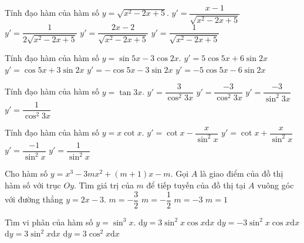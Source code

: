 \begin{ex}%
Tính đạo hàm của hàm số $y=\sqrt{x^{2}-2x+5}$.
\choice
{\True $y'=\dfrac{x-1}{\sqrt{x^{2}-2x+5}}$}
{$y'=\dfrac{1}{2\sqrt{x^{2}-2x+5}}$}
{$y'=\dfrac{2x-2}{\sqrt{x^{2}-2x+5}}$}
{$y'=\dfrac{1}{\sqrt{x^{2}-2x+5}}$}
\end{ex}

\begin{ex}%
Tính đạo hàm của hàm số $y=\sin 5x-3\cos 2x$.
\choice
{\True $y'=5\cos 5x+6\sin 2x$}
{$y'=\cos 5x+3\sin 2x$}
{$y'=-\cos 5x-3\sin 2x$}
{$y'=-5\cos 5x-6\sin 2x$}
\end{ex}

\begin{ex}%
Tính đạo hàm của hàm số $y=\tan 3x$.
\choice
{\True $y'=\dfrac{3}{\cos^{2}3x}$}
{$y'=\dfrac{-3}{\cos^{2}3x}$}
{$y'=\dfrac{-3}{\sin^{2}3x}$}
{$y'=\dfrac{1}{\cos^{2}3x}$}
\end{ex}

\begin{ex}%
Tính đạo hàm của hàm số $y=x\cot x$.
\choice
{\True $y'=\cot x-\dfrac{x}{\sin^{2}x}$}
{$y'=\cot x+\dfrac{x}{\sin^{2}x}$}
{$y'=\dfrac{-1}{\sin^{2}x}$}
{$y'=\dfrac{1}{\sin^{2}x}$}
\end{ex}

\begin{ex}%
Cho hàm số $y=x^{3}-3mx^{2}+(m+1)x-m$. Gọi $A$ là giao điểm của đồ thị hàm số với trục $Oy$. Tìm giá trị của $m$ để tiếp tuyến của đồ thị tại $A$ vuông góc với đường thẳng $y=2x-3$.
\choice
{\True $m=-\dfrac{3}{2}$}
{$m=-\dfrac{1}{2}$}
{$m=-3$}
{$m=1$}
\end{ex}

\begin{ex}%
Tìm vi phân của hàm số $y=\sin^{3}x$.
\choice
{\True $\mathrm{d}y=3\sin^{2}x\cos x\mathrm{d}x$}
{$\mathrm{d}y=-3\sin^{2}x\cos x\mathrm{d}x$}
{$\mathrm{d}y=3\sin^{2}x\mathrm{d}x$}
{$\mathrm{d}y=3\cos^{2}x\mathrm{d}x$}
\end{ex}

